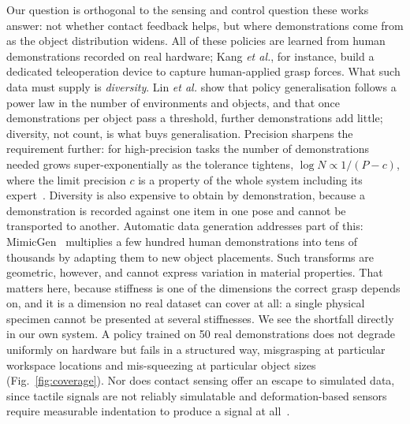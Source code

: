 Our question is orthogonal to the sensing and control question these works answer: not whether
contact feedback helps, but where demonstrations come from as the object distribution widens.
All of these policies are learned from human demonstrations recorded on real hardware; Kang
\emph{et al.}, for instance, build a dedicated teleoperation device to capture human-applied
grasp forces. What such data must supply is \emph{diversity}. Lin \emph{et al.}
\cite{lin2025datascaling} show that policy generalisation follows a power law in the number of
environments and objects, and that once demonstrations per object pass a threshold, further
demonstrations add little; diversity, not count, is what buys generalisation. Precision
sharpens the requirement further: for high-precision tasks the number of demonstrations needed
grows super-exponentially as the tolerance tightens, $\log N \propto 1/(P-c)$, where the limit
precision $c$ is a property of the whole system including its expert~\cite{curseofprecision}.
Diversity is also expensive to obtain by demonstration, because a demonstration is recorded
against one item in one pose and cannot be transported to another. Automatic data generation
addresses part of this: MimicGen~\cite{mandlekar2023mimicgen} multiplies a few hundred human
demonstrations into tens of thousands by adapting them to new object placements. Such
transforms are geometric, however, and cannot express variation in material properties. That
matters here, because stiffness is one of the dimensions the correct grasp depends on, and it
is a dimension no real dataset can cover at all: a single physical specimen cannot be presented
at several stiffnesses. We see the shortfall directly in our own system. A policy trained on 50
real demonstrations does not degrade uniformly on hardware but fails in a structured way,
misgrasping at particular workspace locations and mis-squeezing at particular object sizes
(Fig.~\ref{fig:coverage}). Nor does contact sensing offer an escape to simulated data, since
tactile signals are not reliably simulatable and deformation-based sensors require measurable
indentation to produce a signal at all~\cite{lighttact}.

